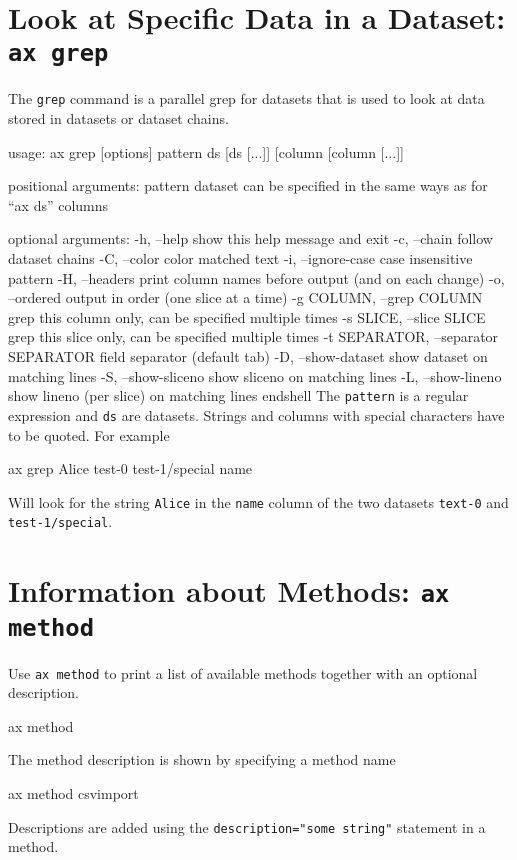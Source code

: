\section{Look at Specific Data in a Dataset: \texttt{ax grep}}
The \texttt{grep} command is a parallel grep for datasets that is
used to look at data stored in datasets or dataset chains.
\begin{shell}
  usage: ax grep [options] pattern ds [ds [...]] [column [column [...]]

    positional arguments:
    pattern
    dataset                   can be specified in the same ways as for ``ax ds''
    columns

    optional arguments:
    -h, --help                show this help message and exit
    -c, --chain               follow dataset chains
    -C, --color               color matched text
    -i, --ignore-case         case insensitive pattern
    -H, --headers             print column names before output (and on each change)
    -o, --ordered             output in order (one slice at a time)
    -g COLUMN, --grep COLUMN  grep this column only, can be specified multiple times
    -s SLICE, --slice SLICE   grep this slice only, can be specified multiple times
    -t SEPARATOR, --separator SEPARATOR   field separator (default tab)
    -D, --show-dataset        show dataset on matching lines
    -S, --show-sliceno        show sliceno on matching lines
    -L, --show-lineno         show lineno (per slice) on matching lines
 end{shell}
\noindent The \texttt{pattern} is a regular expression and \texttt{ds} are
datasets.  Strings and columns with special characters have to be quoted.
For example
\begin{shell}
ax grep Alice test-0 test-1/special name
\end{shell}
Will look for the string \texttt{Alice} in the \texttt{name} column of
the two datasets \texttt{text-0} and \texttt{test-1/special}.


\section{Information about Methods: \texttt{ax method}}
Use \texttt{ax method} to print a list of available methods together
with an optional description.
\begin{shell}
ax method
\end{shell}
The method description is shown by specifying a method name
\begin{shell}
ax method csvimport
\end{shell}
Descriptions are added using the \texttt{description="some string"}
statement in a method.



\end{shell}
